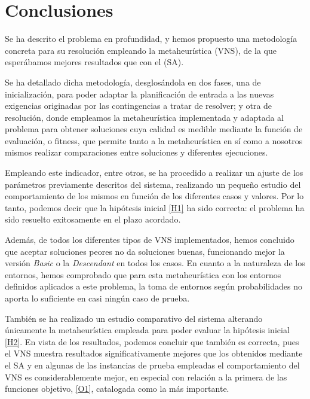 \graphicspath{{capitulos/Capitulo6-Conclusiones/recursos/}}


\section{Conclusiones} \label{capitulo:6}

Se ha descrito el problema en profundidad, y hemos propuesto una metodología concreta para su resolución empleando la metaheurística \vns{} (VNS), de la que esperábamos mejores resultados que con el \sa{} (SA). 

Se ha detallado dicha metodología, desglosándola en dos fases, una de inicialización, para poder adaptar la planificación de entrada a las nuevas exigencias originadas por las contingencias a tratar de resolver; y otra de resolución, donde empleamos la metaheurística implementada y adaptada al problema para obtener soluciones cuya calidad es medible mediante la función de evaluación, o fitness, que permite tanto a la metaheurística en sí como a nosotros mismos realizar comparaciones entre soluciones y diferentes ejecuciones. 

Empleando este indicador, entre otros, se ha procedido a realizar un ajuste de los parámetros previamente descritos del sistema, realizando un pequeño estudio del comportamiento de los mismos en función de los diferentes casos y valores. Por lo tanto, podemos decir que la hipótesis inicial \ref{H1} ha sido correcta: el problema ha sido resuelto exitosamente en el plazo acordado.

Además, de todos los diferentes tipos de VNS implementados, hemos concluido que aceptar soluciones peores no da soluciones buenas, funcionando mejor la versión \textit{Basic} o la \textit{Descendant} en todos los casos. En cuanto a la naturaleza de los entornos, hemos comprobado que para esta metaheurística con los entornos definidos aplicados a este problema, la toma de entornos según probabilidades no aporta lo suficiente en casi ningún caso de prueba.

También se ha realizado un estudio comparativo del sistema alterando únicamente la metaheurística empleada para poder evaluar la hipótesis inicial \ref{H2}. En vista de los resultados, podemos concluir que también es correcta, pues el VNS muestra resultados significativamente mejores que los obtenidos mediante el SA y en algunas de las instancias de prueba empleadas el comportamiento del VNS es considerablemente mejor, en especial con relación a la primera de las funciones objetivo, \ref{O1}, catalogada como la más importante.

